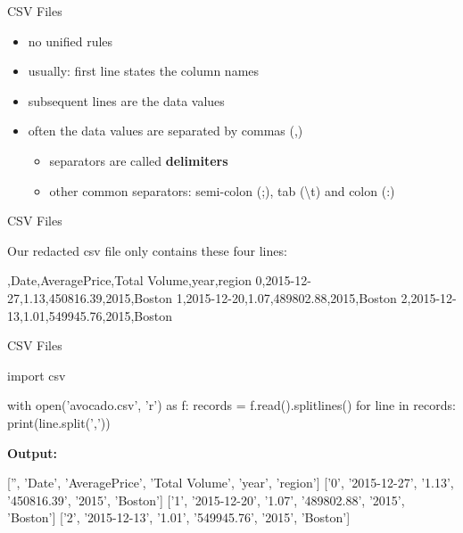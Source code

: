 \documentclass[
  american,
  ignorenonframetext,
]{beamer}
\newenvironment{pyexec}[1]{\noindent \textbf{Output: }  #1}{}
\begin{document}
\begin{frame}{CSV Files}
\protect\hypertarget{csv-files}{}

\begin{itemize}
\item
  no unified rules
\item
  usually: first line states the column names
\item
  subsequent lines are the data values
\item
  often the data values are separated by commas (,)

  \begin{itemize}
  \item
    separators are called \textbf{delimiters}
  \item
    other common separators: semi-colon (;), tab (\textbackslash{}t) and
    colon (:)
  \end{itemize}
\end{itemize}

\end{frame}

\begin{frame}{CSV Files}
\protect\hypertarget{csv-files-1}{}

Our redacted csv file only contains these four lines: \vspace{1em}

\begin{pythoncode}

,Date,AveragePrice,Total Volume,year,region
0,2015-12-27,1.13,450816.39,2015,Boston
1,2015-12-20,1.07,489802.88,2015,Boston
2,2015-12-13,1.01,549945.76,2015,Boston

\end{pythoncode}

\end{frame}

\begin{frame}{CSV Files}
\protect\hypertarget{csv-files-2}{}

\begin{pythoncode}

import csv

with open('avocado.csv', 'r') as f:
    records = f.read().splitlines()
    for line in records:
        print(line.split(','))

\end{pythoncode}

\begin{pyexec}

\begin{outputcode}

['', 'Date', 'AveragePrice', 'Total Volume', 'year', 'region']
['0', '2015-12-27', '1.13', '450816.39', '2015', 'Boston']
['1', '2015-12-20', '1.07', '489802.88', '2015', 'Boston']
['2', '2015-12-13', '1.01', '549945.76', '2015', 'Boston']

\end{outputcode}

\end{pyexec}


\end{frame}
\end{document}
